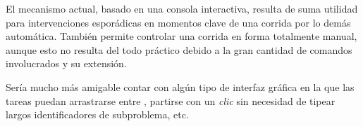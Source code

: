 El mecanismo actual, basado en una consola interactiva, resulta de suma utilidad para intervenciones esporádicas en momentos clave de una corrida por lo demás automática. También permite controlar una corrida en forma totalmente manual, aunque esto no resulta del todo práctico debido a la gran cantidad de comandos involucrados y su extensión.

Sería mucho más amigable contar con algún tipo de interfaz gráfica en la que las tareas puedan arrastrarse entre \ws, partirse con un \emph{clic} sin necesidad de tipear largos identificadores de subproblema, etc.



